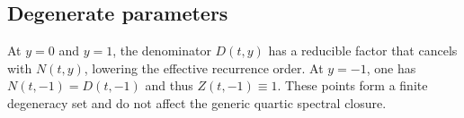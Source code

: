 \subsection{Degenerate parameters}

At \(y=0\) and \(y=1\), the denominator \(D(t,y)\) has a reducible factor that cancels with \(N(t,y)\), lowering the effective recurrence order.
At \(y=-1\), one has \(N(t,-1)=D(t,-1)\) and thus \(Z(t,-1)\equiv 1\).
These points form a finite degeneracy set and do not affect the generic quartic spectral closure.

